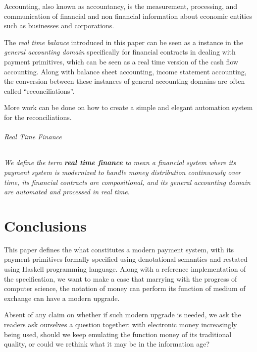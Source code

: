 \begin{displayquote}
Accounting, also known as accountancy, is the measurement, processing, and communication of
financial and non financial information about economic entities such as businesses and
corporations. 
\end{displayquote}

The \textit{real time balance} introduced in this paper can be seen as a instance in
the \textit{general accounting domain} specifically for financial contracts in dealing with payment
primitives, which can be seen as a real time version of the cash flow accounting. Along with balance
sheet accounting, income statement accounting, the conversion between these instances of general
accounting domains are often called ``reconciliations''.

More work can be done on how to create a simple and elegant automation system for the
reconciliations.

\paragraph{Real Time Finance}

\emph{
We define the term \textbf{real time finance} to mean a financial system where its payment system is
modernized to handle money distribution continuously over time, its financial contracts are
compositional, and its general accounting domain are automated and processed in real time.  }

\part*{Conclusions}

This paper defines the what constitutes a modern payment system, with its payment primitives
formally specified using denotational semantics and restated using Haskell programming
language. Along with a reference implementation of the specification, we want to make a case that
marrying with the progress of computer science, the notation of money can perform its function of
medium of exchange can have a modern upgrade.

Absent of any claim on whether if such modern upgrade is needed, we ask the readers ask
ourselves a question together: with electronic money increasingly being used, should we keep
emulating the function money of its traditional quality, or could we rethink what it may be in the
information age?

